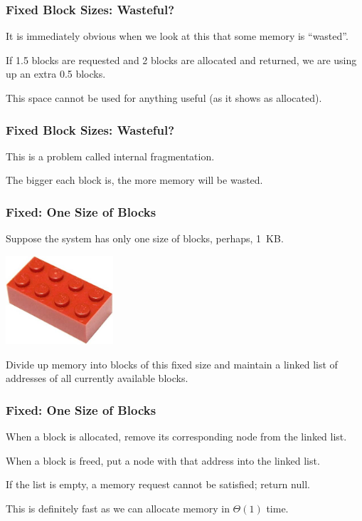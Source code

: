 \begin{frame}
\frametitle{Fixed Block Sizes: Wasteful?}

It is immediately obvious when we look at this that some memory is ``wasted''. 

If 1.5 blocks are requested and 2 blocks are allocated and returned, we are using up an extra 0.5 blocks. 

This space cannot be used for anything useful (as it shows as allocated).

\end{frame}

\begin{frame}
\frametitle{Fixed Block Sizes: Wasteful?} 

This is a problem called \alert{internal fragmentation}.

The bigger each block is, the more memory will be wasted.


\end{frame}

\begin{frame}
\frametitle{Fixed: One Size of Blocks}

Suppose the system has only one size of blocks, perhaps, 1~KB. 

\begin{center}
	\includegraphics[width=0.3\textwidth]{images/lego.jpg}
\end{center}

Divide up memory into blocks of this fixed size and maintain a linked list of addresses of all currently available blocks. 

\end{frame}

\begin{frame}
\frametitle{Fixed: One Size of Blocks}


When a block is allocated, remove its corresponding node from the linked list. 

When a block is freed, put a node with that address into the linked list. 

If the list is empty, a memory request cannot be satisfied; return null.

This is definitely fast as we can allocate memory in $\Theta(1)$ time.


\end{frame}

